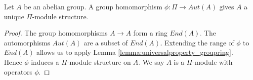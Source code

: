 \begin{lemma} \cite[Proposition IV.1.2.]{maclane}
Let $A$ be an abelian group.
A group homomorphism $\phi: \Pi \to Aut(A)$ gives $A$ a unique $\Pi$-module structure. 
\end{lemma}
\begin{proof}
The group homomorphisms $A \to A$ form a ring $End(A)$.
The automorphisms $Aut(A)$ are a subset of $End(A)$.
Extending the range of $\phi$ to $End(A)$ allows us to apply Lemma \ref{lemma:universalproperty_groupring}.
Hence $\phi$ induces a $\Pi$-module structure on $A$.
We say $A$ is a $\Pi$-module with operators $\phi$.
\end{proof}

